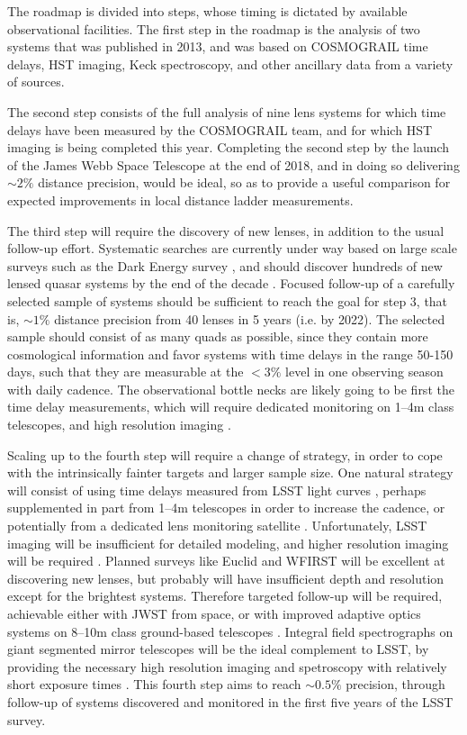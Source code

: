 The roadmap is divided into steps, whose timing is dictated by
available observational facilities.
The first step in the roadmap is the analysis
of two systems that was published in 2013, and was based on COSMOGRAIL time
delays, HST imaging, Keck spectroscopy, and other ancillary data from
a variety of sources.

The second step consists of the full analysis of
nine lens systems for which time delays have been measured by the
COSMOGRAIL team, and for which HST imaging is being completed this
year. Completing the second step by the launch of the James Webb Space
Telescope at the end of 2018,
and in doing so delivering $\sim2\%$ distance precision,
would be ideal, so as to provide a useful
comparison for expected improvements in local distance ladder
measurements.

The third step will require the discovery of new lenses, in addition
to the usual follow-up effort. Systematic searches are currently under
way based on large scale surveys such as the Dark Energy survey
\citep{Agn++15,Mor++16}, and should
discover hundreds of new lensed quasar systems by the
end of the decade \citep{O+M10}.
Focused follow-up of a carefully selected sample of
systems should be sufficient to reach the goal for step 3, that is,
$\sim1\%$ distance precision from 40
lenses in 5 years (i.e. by 2022). The selected sample should
consist of as many quads as possible, since they contain more
cosmological information and favor systems with time delays in the
range 50-150 days, such that they are measurable at the
$<3\%$ level in one observing
season with daily cadence. The observational bottle necks are likely
going to be first the time delay measurements, which will require
dedicated monitoring on 1--4m class telescopes, and high resolution
imaging \citep{Tre++13}.

Scaling up to the fourth step will require a change of strategy, in
order to cope with the intrinsically fainter targets and larger sample
size. One natural strategy will consist of using time delays measured
from LSST light curves \citep{LiaoEtal2015}, perhaps supplemented in
part from 1--4m telescopes in order to increase the cadence, or potentially
from a dedicated lens monitoring satellite
\citep{Mou++08}. Unfortunately, LSST imaging will be insufficient for
detailed modeling, and higher resolution imaging will be required
\citep{Men++15}.
Planned surveys like Euclid and WFIRST will be excellent at
discovering new lenses, but probably will have insufficient depth and
resolution except for the brightest systems. Therefore targeted
follow-up will be required, achievable either with JWST from space, or
with improved adaptive optics systems on 8--10m class ground-based
telescopes \citep{Mar++07,Che++16,Rus++16}. Integral field
spectrographs on giant segmented mirror telescopes will be the ideal
complement to LSST, by providing the necessary high resolution imaging
and spetroscopy with relatively short exposure times
\citep[e.g.][]{Ski++15}.
This fourth step
aims to reach $\sim0.5\%$ precision, through follow-up of systems discovered
and monitored in the first five years of the LSST survey.

